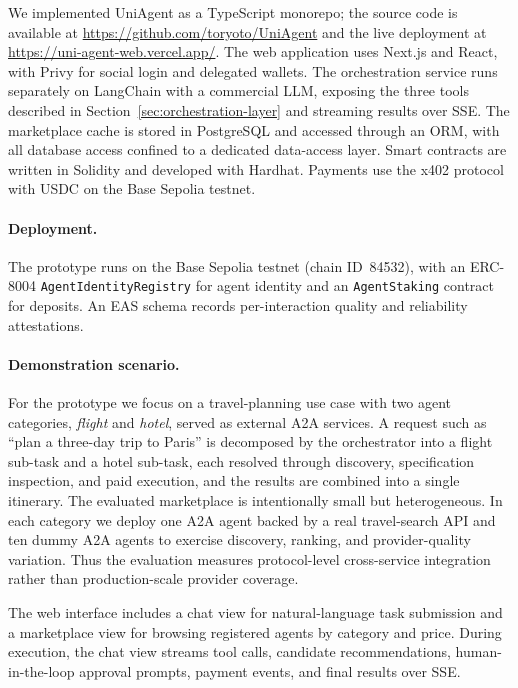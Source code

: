 \documentclass[sigconf]{acmart}
\begin{document}
We implemented UniAgent as a TypeScript monorepo; the source code is
available at \url{https://github.com/toryoto/UniAgent} and the live
deployment at \url{https://uni-agent-web.vercel.app/}. The web application
uses Next.js and React, with Privy for social login and delegated wallets.
The orchestration service runs separately on LangChain with a commercial
LLM, exposing the three tools described in
Section~\ref{sec:orchestration-layer} and streaming results over SSE.
The marketplace cache is stored in PostgreSQL and accessed through an
ORM, with all database access confined to a dedicated data-access layer.
Smart contracts are written in Solidity and developed with Hardhat.
Payments use the x402 protocol with USDC on the Base Sepolia testnet.

\paragraph{Deployment.}
The prototype runs on the Base Sepolia testnet (chain ID~84532), with an
ERC-8004 \texttt{AgentIdentityRegistry} for agent identity and an
\texttt{AgentStaking} contract for deposits. An EAS schema records
per-interaction quality and reliability attestations.

\paragraph{Demonstration scenario.}
For the prototype we focus on a travel-planning use case with two agent
categories, \emph{flight} and \emph{hotel}, served as external A2A
services. A request such as ``plan a three-day trip to Paris'' is
decomposed by the orchestrator into a flight sub-task and a hotel
sub-task, each resolved through discovery, specification inspection, and
paid execution, and the results are combined into a single itinerary.
The evaluated marketplace is intentionally small but heterogeneous. In
each category we deploy one A2A agent backed by a real travel-search API
and ten dummy A2A agents to exercise discovery, ranking, and
provider-quality variation. Thus the evaluation measures protocol-level
cross-service integration rather than production-scale provider coverage.

The web interface includes a chat view for natural-language task
submission and a marketplace view for browsing registered agents by
category and price. During execution, the chat view streams tool calls,
candidate recommendations, human-in-the-loop approval prompts, payment
events, and final results over SSE.
\end{document}
